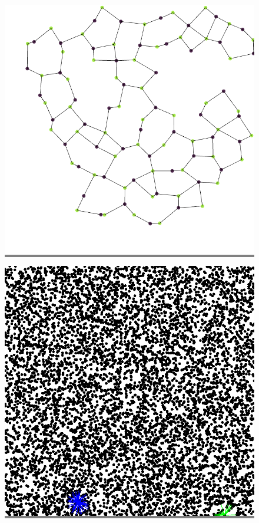 \documentclass{article}
\begin{document}
\begin{figure}
\begin{minipage}{0.3\textwidth}
    \end{minipage}
    \hspace{\fill}
    \begin{minipage}{0.3\textwidth}
    \colorbox{gray}{\includegraphics[width=\linewidth]{./images/square_0_bb_1.png}}
    \end{minipage}
    \vskip 0.1in
    \begin{minipage}{0.3\textwidth}
    \colorbox{gray}{\includegraphics[width=\linewidth]{./images/square_1.png}}

\end{minipage}
\end{figure}
\end{document}
